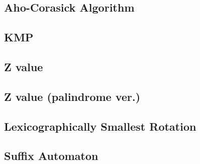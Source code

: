 \documentclass[a4paper,10pt,twocolumn,oneside]{article}
\begin{document}
\subsection{Aho-Corasick Algorithm}


\subsection{KMP}


\subsection{Z value}


\subsection{Z value (palindrome ver.)}


\subsection{Lexicographically Smallest Rotation}


\subsection{Suffix Automaton}

\end{document}
